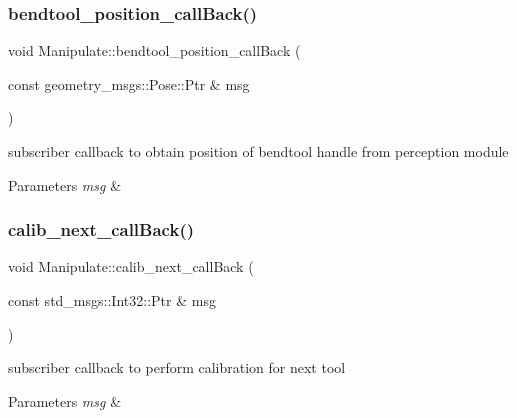 \subsubsection{\texorpdfstring{bendtool\+\_\+position\+\_\+call\+Back()}{bendtool\_position\_callBack()}}
{\footnotesize\ttfamily void Manipulate\+::bendtool\+\_\+position\+\_\+call\+Back (\begin{DoxyParamCaption}\item[{const geometry\+\_\+msgs\+::\+Pose\+::\+Ptr \&}]{msg }\end{DoxyParamCaption})\hspace{0.3cm}{\ttfamily [private]}}



subscriber callback to obtain position of bendtool handle from perception module 


\begin{DoxyParams}{Parameters}
{\em msg} & \\
\hline
\end{DoxyParams}
\mbox{\label{structManipulate_a9e3d1cc97074dbddcfe4abaa9a55425e}} 
\subsubsection{\texorpdfstring{calib\+\_\+next\+\_\+call\+Back()}{calib\_next\_callBack()}}
{\footnotesize\ttfamily void Manipulate\+::calib\+\_\+next\+\_\+call\+Back (\begin{DoxyParamCaption}\item[{const std\+\_\+msgs\+::\+Int32\+::\+Ptr \&}]{msg }\end{DoxyParamCaption})\hspace{0.3cm}{\ttfamily [private]}}



subscriber callback to perform calibration for next tool 


\begin{DoxyParams}{Parameters}
{\em msg} & \\
\hline
\end{DoxyParams}
\mbox{\label{structManipulate_ab242dd492f9b8fc88564bb6583e0324a}} 
